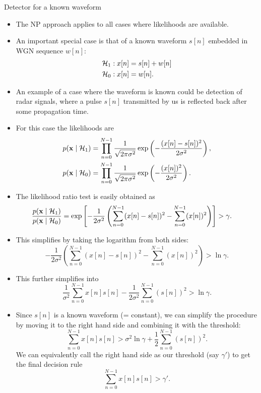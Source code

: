 \documentclass[10pt, aspectratio=169]{beamer} %
\newcommand{\x}{{\bf x}}
\begin{document}
\begin{frame}[allowframebreaks=0.8]
 {Detector for a known waveform}
\begin{itemize}

\item The NP approach applies to all cases where likelihoods are available.
\item An important special case is that of a known waveform $s[n]$ embedded in WGN sequence $w[n]$:
\begin{align*}
{\cal H}_1 &: x[n] = s[n] + w[n] \\
{\cal H}_0 &: x[n] = w[n].
\end{align*}
\item An example of a case where the waveform is known could be detection of radar 
signals, where a pulse $s[n]$ transmitted by us is reflected back after some 
propagation time.

\framebreak

\item For this case the likelihoods are
\begin{align*}
p(\x\mid {\cal H}_1) & =  \prod_{n=0}^{N-1}\frac{1}{\sqrt{2\pi\sigma^2}}\exp\left(-\frac{(x[n]-s[n])^2}{2\sigma^2}\right),\\
p(\x\mid {\cal H}_0) & =  \prod_{n=0}^{N-1}\frac{1}{\sqrt{2\pi\sigma^2}}\exp\left(-\frac{(x[n])^2}{2\sigma^2}\right).
\end{align*}
\item The likelihood ratio test is easily obtained as
\[
\hspace*{-0.5cm}
\frac{p(\x\mid {\cal H}_1)}{p(\x\mid {\cal H}_0)} = \exp\left[ -\frac{1}{2\sigma^2} \left( \sum_{n=0}^{N-1}(x[n]-s[n])^2 - \sum_{n=0}^{N-1}(x[n])^2 \right)\right] > \gamma.
\]
\item This simplifies by taking the logarithm from both sides:
\[
-\frac{1}{2\sigma^2} \left( \sum_{n=0}^{N-1}(x[n]-s[n])^2 - \sum_{n=0}^{N-1}(x[n])^2 \right) > \ln \gamma.
\]
\item This further simplifies into
\[
\frac{1}{\sigma^2} \sum_{n=0}^{N-1}x[n]s[n] - \frac{1}{2\sigma^2}\sum_{n=0}^{N-1}(s[n])^2 > \ln \gamma.
\]
\item Since $s[n]$ is a known waveform (= constant), we can simplify the procedure by moving
it to the right hand side and combining it with the threshold:
\[
 \sum_{n=0}^{N-1}x[n]s[n]  > \sigma^2 \ln \gamma + \frac{1}{2}\sum_{n=0}^{N-1}(s[n])^2.
\]
We can equivalently call the right hand side as our threshold (say $\gamma'$) to get the
final decision rule
\[
 \sum_{n=0}^{N-1}x[n]s[n]  > \gamma'.
\]

\end{itemize}
\end{frame}
\end{document}
